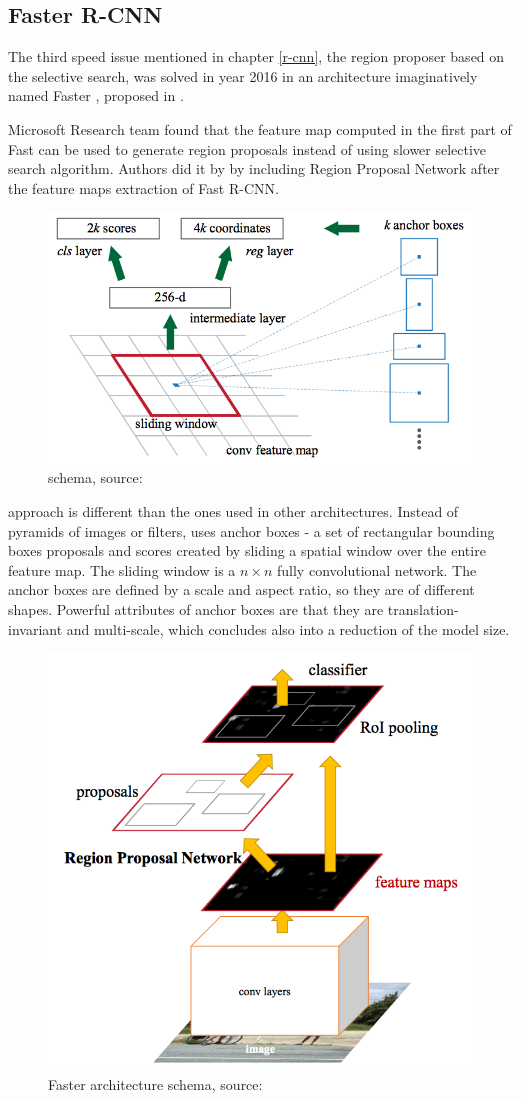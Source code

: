 \subsection{Faster R-CNN}
\label{faster-rcnn}

The third speed issue mentioned in chapter \ref{r-cnn}, the region proposer 
based on the selective search, was solved in year 2016 in an architecture 
imaginatively named Faster , proposed in \cite{faster-rcnn}.

Microsoft Research team found that the feature map computed in the first part of 
Fast  can be used to generate region proposals instead of using slower 
selective search algorithm. Authors did it by by including Region Proposal 
Network  after the feature maps extraction of Fast R-CNN.

\begin{figure}[H]
   \centering
	\includegraphics[width=.5\linewidth]{./pictures/fasterrcnn-anchors.png}
	\caption[Region proposal network]{ schema, source: \cite{faster-rcnn}}
      \label{fig:rpn}
\end{figure}

 approach is different than the ones used in other architectures. 
Instead of pyramids of images or filters,  uses anchor boxes - a set of 
rectangular bounding boxes proposals and scores created by sliding a spatial 
window over the entire feature map. The sliding window is a $n \times n$ fully 
convolutional network. The anchor boxes are defined by a scale and aspect ratio, 
so they are of different shapes. Powerful attributes of anchor boxes are that 
they are translation-invariant and multi-scale, which concludes also into a 
reduction of the model size.

\begin{figure}[H]
   \centering
	\includegraphics[width=.55\linewidth]{./pictures/fasterrcnn.png}
	\caption[Faster R-CNN architecture]{Faster  architecture schema, 
source: \cite{faster-rcnn}}
      \label{fig:faster-rcnn}
\end{figure}

